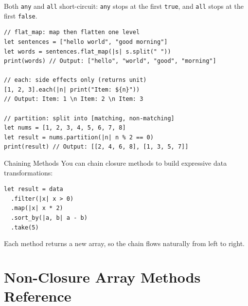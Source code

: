 Both \lstinline|any| and \lstinline|all| short-circuit: \lstinline|any| stops at the first \lstinline|true|, and \lstinline|all| stops at the first \lstinline|false|.

\begin{lstlisting}[language=Lattice, caption={flat\_map, each, and partition}]
// flat_map: map then flatten one level
let sentences = ["hello world", "good morning"]
let words = sentences.flat_map(|s| s.split(" "))
print(words) // Output: ["hello", "world", "good", "morning"]

// each: side effects only (returns unit)
[1, 2, 3].each(|n| print("Item: ${n}"))
// Output: Item: 1 \n Item: 2 \n Item: 3

// partition: split into [matching, non-matching]
let nums = [1, 2, 3, 4, 5, 6, 7, 8]
let result = nums.partition(|n| n % 2 == 0)
print(result) // Output: [[2, 4, 6, 8], [1, 3, 5, 7]]
\end{lstlisting}

\begin{tipbox}{Chaining Methods}
You can chain closure methods to build expressive data transformations:
\begin{lstlisting}[language=Lattice, numbers=none]
let result = data
  .filter(|x| x > 0)
  .map(|x| x * 2)
  .sort_by(|a, b| a - b)
  .take(5)
\end{lstlisting}
Each method returns a new array, so the chain flows naturally from left to right.
\end{tipbox}

\section{Non-Closure Array Methods Reference}\label{sec:array-reference}

